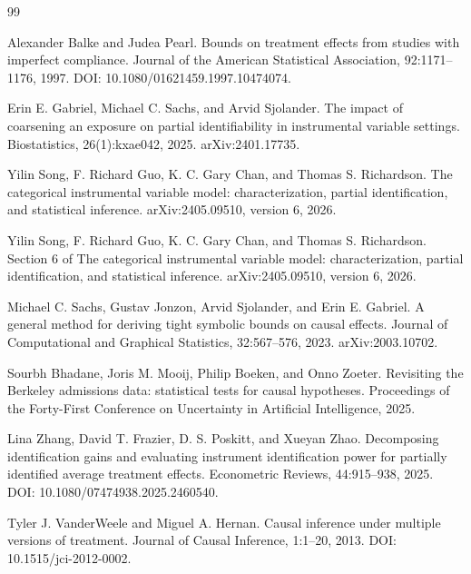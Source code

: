 \documentclass{article}
\begin{document}
\begin{thebibliography}{99}

   Alexander Balke and Judea Pearl. Bounds on treatment effects from studies with imperfect compliance. Journal of the American Statistical Association, 92:1171--1176, 1997. DOI: 10.1080/01621459.1997.10474074.

   Erin E. Gabriel, Michael C. Sachs, and Arvid Sjolander. The impact of coarsening an exposure on partial identifiability in instrumental variable settings. Biostatistics, 26(1):kxae042, 2025. arXiv:2401.17735.

   Yilin Song, F. Richard Guo, K. C. Gary Chan, and Thomas S. Richardson. The categorical instrumental variable model: characterization, partial identification, and statistical inference. arXiv:2405.09510, version 6, 2026.

   Yilin Song, F. Richard Guo, K. C. Gary Chan, and Thomas S. Richardson. Section 6 of The categorical instrumental variable model: characterization, partial identification, and statistical inference. arXiv:2405.09510, version 6, 2026.

   Michael C. Sachs, Gustav Jonzon, Arvid Sjolander, and Erin E. Gabriel. A general method for deriving tight symbolic bounds on causal effects. Journal of Computational and Graphical Statistics, 32:567--576, 2023. arXiv:2003.10702.

   Sourbh Bhadane, Joris M. Mooij, Philip Boeken, and Onno Zoeter. Revisiting the Berkeley admissions data: statistical tests for causal hypotheses. Proceedings of the Forty-First Conference on Uncertainty in Artificial Intelligence, 2025.

   Lina Zhang, David T. Frazier, D. S. Poskitt, and Xueyan Zhao. Decomposing identification gains and evaluating instrument identification power for partially identified average treatment effects. Econometric Reviews, 44:915--938, 2025. DOI: 10.1080/07474938.2025.2460540.

   Tyler J. VanderWeele and Miguel A. Hernan. Causal inference under multiple versions of treatment. Journal of Causal Inference, 1:1--20, 2013. DOI: 10.1515/jci-2012-0002.


\end{thebibliography}
\end{document}
